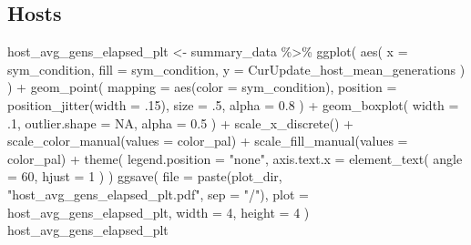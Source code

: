 \documentclass[
]{book}
\newenvironment{Shaded}{\begin{snugshade}}{\end{snugshade}}
\newcommand{\AttributeTok}[1]{\textcolor[rgb]{0.77,0.63,0.00}{#1}}
\newcommand{\ConstantTok}[1]{\textcolor[rgb]{0.00,0.00,0.00}{#1}}
\newcommand{\DecValTok}[1]{\textcolor[rgb]{0.00,0.00,0.81}{#1}}
\newcommand{\FloatTok}[1]{\textcolor[rgb]{0.00,0.00,0.81}{#1}}
\newcommand{\FunctionTok}[1]{\textcolor[rgb]{0.00,0.00,0.00}{#1}}
\newcommand{\NormalTok}[1]{#1}
\newcommand{\OtherTok}[1]{\textcolor[rgb]{0.56,0.35,0.01}{#1}}
\newcommand{\SpecialCharTok}[1]{\textcolor[rgb]{0.00,0.00,0.00}{#1}}
\newcommand{\StringTok}[1]{\textcolor[rgb]{0.31,0.60,0.02}{#1}}
\begin{document}
\hypertarget{hosts}{%
\subsection{Hosts}\label{hosts}}

\begin{Shaded}
\begin{Highlighting}[]
\NormalTok{host\_avg\_gens\_elapsed\_plt }\OtherTok{\textless{}{-}}\NormalTok{ summary\_data }\SpecialCharTok{\%\textgreater{}\%}
  \FunctionTok{ggplot}\NormalTok{(}
    \FunctionTok{aes}\NormalTok{(}
      \AttributeTok{x =}\NormalTok{ sym\_condition,}
      \AttributeTok{fill =}\NormalTok{ sym\_condition,}
      \AttributeTok{y =}\NormalTok{ CurUpdate\_host\_mean\_generations}
\NormalTok{    )}
\NormalTok{  ) }\SpecialCharTok{+}
  \FunctionTok{geom\_point}\NormalTok{(}
    \AttributeTok{mapping =} \FunctionTok{aes}\NormalTok{(}\AttributeTok{color =}\NormalTok{ sym\_condition),}
    \AttributeTok{position =} \FunctionTok{position\_jitter}\NormalTok{(}\AttributeTok{width =}\NormalTok{ .}\DecValTok{15}\NormalTok{),}
    \AttributeTok{size =}\NormalTok{ .}\DecValTok{5}\NormalTok{,}
    \AttributeTok{alpha =} \FloatTok{0.8}
\NormalTok{  ) }\SpecialCharTok{+}
  \FunctionTok{geom\_boxplot}\NormalTok{(}
    \AttributeTok{width =}\NormalTok{ .}\DecValTok{1}\NormalTok{,}
    \AttributeTok{outlier.shape =} \ConstantTok{NA}\NormalTok{,}
    \AttributeTok{alpha =} \FloatTok{0.5}
\NormalTok{  ) }\SpecialCharTok{+}
  \FunctionTok{scale\_x\_discrete}\NormalTok{() }\SpecialCharTok{+}
  \FunctionTok{scale\_color\_manual}\NormalTok{(}\AttributeTok{values =}\NormalTok{ color\_pal) }\SpecialCharTok{+}
  \FunctionTok{scale\_fill\_manual}\NormalTok{(}\AttributeTok{values =}\NormalTok{ color\_pal) }\SpecialCharTok{+}
  \FunctionTok{theme}\NormalTok{(}
    \AttributeTok{legend.position =} \StringTok{"none"}\NormalTok{,}
    \AttributeTok{axis.text.x =} \FunctionTok{element\_text}\NormalTok{(}
      \AttributeTok{angle =} \DecValTok{60}\NormalTok{,}
      \AttributeTok{hjust =} \DecValTok{1}
\NormalTok{    )}
\NormalTok{  )}
\FunctionTok{ggsave}\NormalTok{(}
  \AttributeTok{file =} \FunctionTok{paste}\NormalTok{(plot\_dir, }\StringTok{"host\_avg\_gens\_elapsed\_plt.pdf"}\NormalTok{, }\AttributeTok{sep =} \StringTok{"/"}\NormalTok{),}
  \AttributeTok{plot =}\NormalTok{ host\_avg\_gens\_elapsed\_plt,}
  \AttributeTok{width =} \DecValTok{4}\NormalTok{,}
  \AttributeTok{height =} \DecValTok{4}
\NormalTok{)}
\NormalTok{host\_avg\_gens\_elapsed\_plt}
\end{Highlighting}
\end{Shaded}
\end{document}
